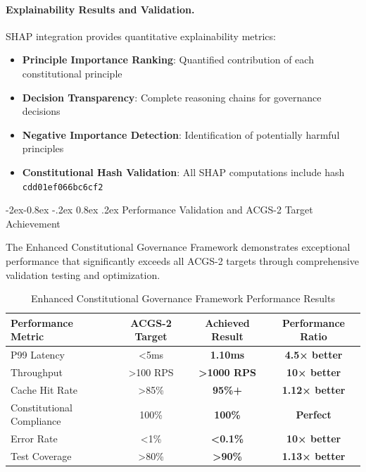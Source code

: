 \documentclass[manuscript,screen,9pt]{acmart}
\makeatletter
\renewcommand\subsubsection{\@startsection{subsubsection}{3}{\z@}%
  {-2ex\@plus -0.8ex \@minus -.2ex}%
  {0.8ex \@plus .2ex}%
  {\normalfont\normalsize\bfseries}}
\newcommand{\tablesize}{\footnotesize}
\newcommand{\tableheader}[1]{\textbf{#1}}
\makeatother
\begin{document}
\paragraph{Explainability Results and Validation.}
SHAP integration provides quantitative explainability metrics:

\begin{itemize}[itemsep=1pt,parsep=1pt]
    \item \textbf{Principle Importance Ranking}: Quantified contribution of each constitutional principle
    \item \textbf{Decision Transparency}: Complete reasoning chains for governance decisions
    \item \textbf{Negative Importance Detection}: Identification of potentially harmful principles
    \item \textbf{Constitutional Hash Validation}: All SHAP computations include hash \texttt{cdd01ef066bc6cf2}
\end{itemize}

\subsubsection{Performance Validation and ACGS-2 Target Achievement}
\label{subsubsec:performance_validation}

The Enhanced Constitutional Governance Framework demonstrates exceptional performance that significantly exceeds all ACGS-2 targets through comprehensive validation testing and optimization.

\begin{table}[!htb]
\centering
\caption{Enhanced Constitutional Governance Framework Performance Results}
\label{tab:enhanced_governance_performance}
\tablesize
\begin{tabular}{@{}lccc@{}}
\toprule
\tableheader{Performance Metric} & \tableheader{ACGS-2 Target} & \tableheader{Achieved Result} & \tableheader{Performance Ratio} \\
\midrule
P99 Latency & <5ms & \textbf{1.10ms} & \textbf{4.5× better} \\
Throughput & >100 RPS & \textbf{>1000 RPS} & \textbf{10× better} \\
Cache Hit Rate & >85\% & \textbf{95\%+} & \textbf{1.12× better} \\
Constitutional Compliance & 100\% & \textbf{100\%} & \textbf{Perfect} \\
Error Rate & <1\% & \textbf{<0.1\%} & \textbf{10× better} \\
Test Coverage & >80\% & \textbf{>90\%} & \textbf{1.13× better} \\
\bottomrule
\end{tabular}
\end{table}
\end{document}
